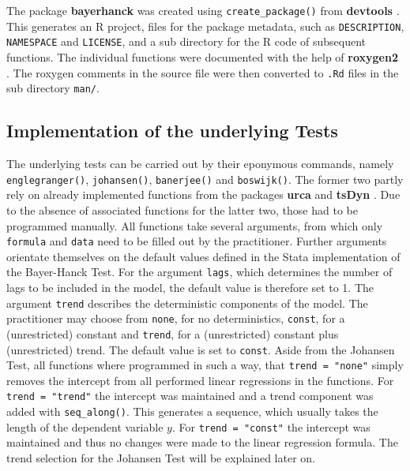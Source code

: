 \documentclass[11pt,a4paper]{article}
\begin{document}
The package \textbf{bayerhanck} was created using
\texttt{create\_package()} from \textbf{devtools}
\autocite{hester_devtools_2020}. This generates an R project, files for
the package metadata, such as \texttt{DESCRIPTION}, \texttt{NAMESPACE}
and \texttt{LICENSE}, and a sub directory for the R code of subsequent
functions. The individual functions were documented with the help of
\textbf{roxygen2} \autocite{wickham_roxygen2_2020}. The roxygen comments
in the source file were then converted to \texttt{.Rd} files in the sub
directory \texttt{man/}.

\hypertarget{implementation-of-the-underlying-tests}{%
\subsection{Implementation of the underlying
Tests}\label{implementation-of-the-underlying-tests}}

The underlying tests can be carried out by their eponymous commands,
namely \texttt{englegranger()}, \texttt{johansen()}, \texttt{banerjee()}
and \texttt{boswijk()}. The former two partly rely on already
implemented functions from the packages \textbf{urca}
\autocite{pfaff_urca_2020} and \textbf{tsDyn}
\autocite{stigler_tsdyn_2020}. Due to the absence of associated
functions for the latter two, those had to be programmed manually. All
functions take several arguments, from which only \texttt{formula} and
\texttt{data} need to be filled out by the practitioner. Further
arguments orientate themselves on the default values defined in the
Stata implementation of the Bayer-Hanck Test. For the argument
\texttt{lags}, which determines the number of lags to be included in the
model, the default value is therefore set to 1. The argument
\texttt{trend} describes the deterministic components of the model. The
practitioner may choose from \texttt{none}, for no deterministics,
\texttt{const}, for a (unrestricted) constant and \texttt{trend}, for a
(unrestricted) constant plus (unrestricted) trend. The default value is
set to \texttt{const}. Aside from the Johansen Test, all functions where
programmed in such a way, that \texttt{trend\ =\ "none"} simply removes
the intercept from all performed linear regressions in the functions.
For \texttt{trend\ =\ "trend"} the intercept was maintained and a trend
component was added with \texttt{seq\_along()}. This generates a
sequence, which usually takes the length of the dependent variable
\(y\). For \texttt{trend\ =\ "const"} the intercept was maintained and
thus no changes were made to the linear regression formula. The trend
selection for the Johansen Test will be explained later on.
\end{document}
